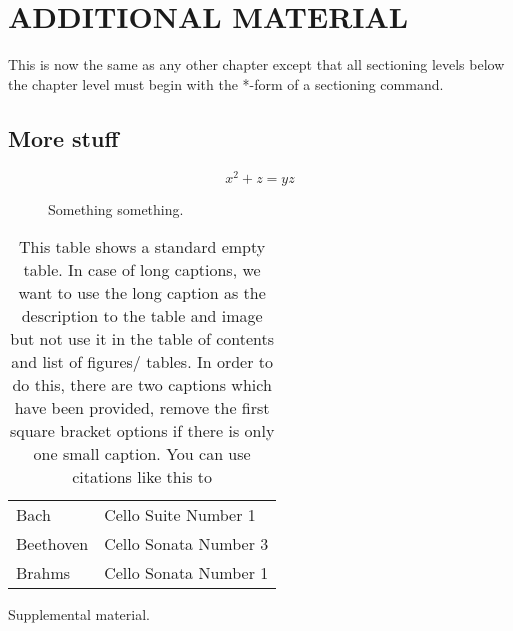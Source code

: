 



\unappendixtitle
\singleappendixtitle
{}

\chapter{ADDITIONAL MATERIAL} 


This is now the same as any other chapter except that
all sectioning levels below the chapter level must begin
with the *-form of a sectioning command.

\section*{More stuff}
\begin{equation}
    x^2+z=yz
\end{equation}
\begin{figure}
    \caption{Something something.}
\end{figure}
\begin{table}[h!tb] \centering
    \caption[This table shows a standard non-empty table. Please check the code caption for extended instructions]{This table shows a standard empty table. In case of long captions, we want to use the long caption as the description to the table and image but not use it in the table of contents and list of figures/ tables. In order to do this, there are two captions which have been provided, remove the first square bracket options if there is only one small caption. You can use citations like this to}
    \begin{tabular}{ll}
        Bach            &Cello Suite Number 1  \\
        Beethoven       &Cello Sonata Number 3 \\
        Brahms          &Cello Sonata Number 1
      \end{tabular}
\label{nothingagain}

\vspace{ 2 in}
\end{table}
Supplemental material.

